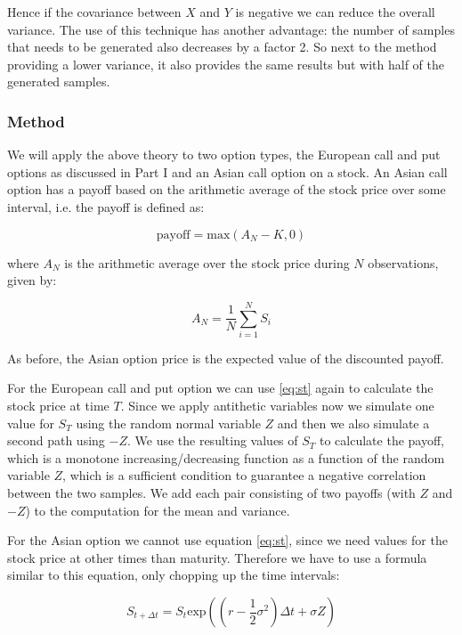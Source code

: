\documentclass[11pt,a4paper]{article}
\begin{document}
Hence if the covariance between $X$ and $Y$ is negative we can reduce the overall variance. The use of this technique has another advantage: the number of samples that needs to be generated also decreases by a factor 2. So next to the method providing a lower variance, it also provides the same results but with half of the generated samples.

\subsubsection{Method}
We will apply the above theory to two option types, the European call and put options as discussed in Part I and an Asian call option on a stock. An Asian call option has a payoff based on the arithmetic average of the stock price over some interval, i.e. the payoff is defined as:

\begin{equation}
  \label{eq:asian}
  \text{payoff} = \text{max}(A_N - K,0)
\end{equation}

where $A_N$ is the arithmetic average over the stock price during $N$ observations, given by:

\begin{equation}
  \label{eq:an}
  A_N = \frac{1}{N}\sum_{i=1}^N S_i
\end{equation}

As before, the Asian option price is the expected value of the discounted payoff.

For the European call and put option we can use \ref{eq:st} again to calculate the stock price at time $T$. Since we apply antithetic variables now we simulate one value for $S_T$ using the random normal variable $Z$ and then we also simulate a second path using $-Z$. We use the resulting values of $S_T$ to calculate the payoff, which is a monotone increasing/decreasing function as a function of the random variable $Z$, which is a sufficient condition to guarantee a negative correlation between the two samples. We add each pair consisting of two payoffs (with $Z$ and $-Z$) to the computation for the mean and variance.

For the Asian option we cannot use equation \ref{eq:st}, since we need values for the stock price at other times than maturity. Therefore we have to use a formula similar to this equation, only chopping up the time intervals:

\begin{equation}
  \label{eq:asians}
  S_{t+\Delta t} = S_t \text{exp}((r-\frac{1}{2}\sigma^2)\Delta t + \sigma Z)
\end{equation}
\end{document}
